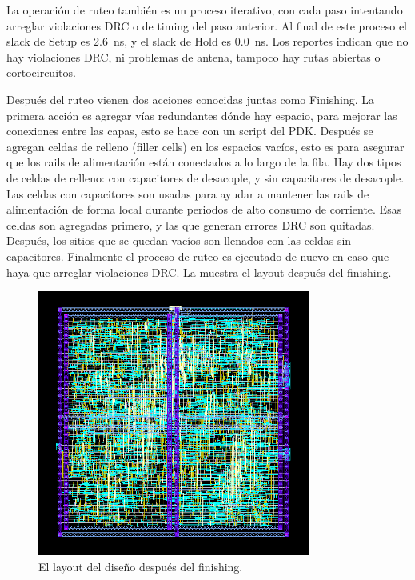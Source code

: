 \documentclass[a4paper, twoside, 11pt]{report}
\begin{document}
La operación de ruteo también es un proceso iterativo, con cada paso intentando arreglar violaciones DRC o de timing del paso anterior. Al final de este proceso el slack de Setup es \SI{2.6}{\nano\second}, y el slack de Hold es \SI{0.0}{\nano\second}. Los reportes indican que no hay violaciones DRC, ni problemas de antena, tampoco hay rutas abiertas o cortocircuitos.

Después del ruteo vienen dos acciones conocidas juntas como Finishing. La primera acción es agregar vías redundantes dónde hay espacio, para mejorar las conexiones entre las capas, esto se hace con un script del PDK. Después se agregan celdas de relleno (filler cells) en los espacios vacíos, esto es para asegurar que los rails de alimentación están conectados a lo largo de la fila. Hay dos tipos de celdas de relleno: con capacitores de desacople, y sin capacitores de desacople. Las celdas con capacitores son usadas para ayudar a mantener las rails de alimentación de forma local durante periodos de alto consumo de corriente. Esas celdas son agregadas primero, y las que generan errores DRC son quitadas. Después, los sitios que se quedan vacíos son llenados con las celdas sin capacitores. Finalmente el proceso de ruteo es ejecutado de nuevo en caso que haya que arreglar violaciones DRC. La  muestra el layout después del finishing.

\begin{figure}[htb]
  \centering
  \includegraphics[width=0.8\textwidth]{./img/pnr_out}
  \caption{El layout del diseño después del finishing.}
  \label{fig:pnr_out}
\end{figure}
\end{document}
